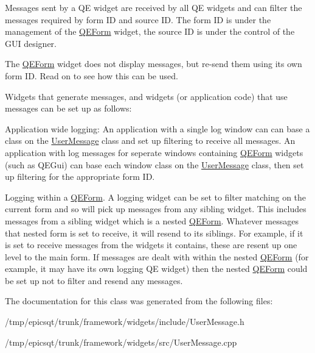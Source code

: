 Messages sent by a QE widget are received by all QE widgets and can filter the messages required by form ID and source ID. The form ID is under the management of the \hyperlink{classQEForm}{QEForm} widget, the source ID is under the control of the GUI designer.

The \hyperlink{classQEForm}{QEForm} widget does not display messages, but re-\/send them using its own form ID. Read on to see how this can be used.

Widgets that generate messages, and widgets (or application code) that use messages can be set up as follows:


\begin{DoxyItemize}
\item Application wide logging: An application with a single log window can can base a class on the \hyperlink{classUserMessage}{UserMessage} class and set up filtering to receive all messages. An application with log messages for seperate windows containing \hyperlink{classQEForm}{QEForm} widgets (such as QEGui) can base each window class on the \hyperlink{classUserMessage}{UserMessage} class, then set up filtering for the appropriate form ID.
\end{DoxyItemize}


\begin{DoxyItemize}
\item Logging within a \hyperlink{classQEForm}{QEForm}. A logging widget can be set to filter matching on the current form and so will pick up messages from any sibling widget. This includes messages from a sibling widget which is a nested \hyperlink{classQEForm}{QEForm}. Whatever messages that nested form is set to receive, it will resend to its siblings. For example, if it is set to receive messages from the widgets it contains, these are resent up one level to the main form. If messages are dealt with within the nested \hyperlink{classQEForm}{QEForm} (for example, it may have its own logging QE widget) then the nested \hyperlink{classQEForm}{QEForm} could be set up not to filter and resend any messages. 
\end{DoxyItemize}

The documentation for this class was generated from the following files:\begin{DoxyCompactItemize}
\item 
/tmp/epicsqt/trunk/framework/widgets/include/UserMessage.h\item 
/tmp/epicsqt/trunk/framework/widgets/src/UserMessage.cpp\end{DoxyCompactItemize}
